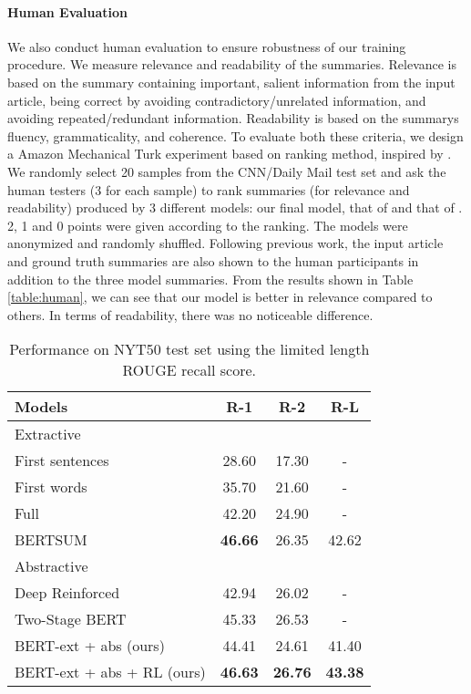 \documentclass[11pt,a4paper]{article}
\begin{document}
\paragraph{Human Evaluation}
We also conduct human evaluation to ensure robustness of our training procedure. We measure
relevance and readability of the summaries. Relevance is based on the summary containing important, salient information from the input article,
being correct by avoiding contradictory/unrelated
information, and avoiding repeated/redundant information. Readability is based on the summarys fluency, grammaticality, and coherence. To
evaluate both these criteria, we design a Amazon Mechanical Turk experiment based on ranking method, inspired by \citet{kiritchenko-mohammad-2017-best}.
We randomly select 20 samples from the CNN/Daily Mail test set and
ask the human testers (3 for each sample) to rank summaries (for relevance and readability) produced by 3 different models:
our final model, that of \citet{chen-bansal-2018-fast} and  that of \citet{liu2019fine}.
2, 1 and 0 points were given according to the ranking.
The models were anonymized and randomly shuffled.
Following previous work,
the input article and ground truth summaries are
also shown to the human participants in addition
to the three model summaries.
From the results shown in Table \ref{table:human}, we can see that our model is
better in relevance compared to others. In terms of readability, there was no
noticeable difference.



\begin{table}
\begin{center}
\begin{adjustbox}{max width=\columnwidth}
\begin{tabular}{l|ccc}
    \hline 
    \bf Models & \bf R-1 & \bf R-2 & \bf R-L \\ 
    \hline
    \multicolumn{4}{l}{Extractive} \\
    \hline
    First sentences \cite{durrett-etal-2016-learning} & 28.60 & 17.30 & - \\
    First  words \cite{durrett-etal-2016-learning} & 35.70 & 21.60 & - \\
    Full \cite{durrett-etal-2016-learning} & 42.20 & 24.90 & - \\
    BERTSUM \cite{liu2019fine} & \bf 46.66 & 26.35 & 42.62 \\
    \hline
    \multicolumn{4}{l}{Abstractive} \\
    \hline
    Deep Reinforced \cite{paulus2018a} & 42.94 & 26.02 & - \\
    Two-Stage BERT \cite{zhang2019pretraining} & 45.33 & 26.53 & - \\
    BERT-ext + abs (ours) & 44.41 & 24.61 & 41.40 \\
    BERT-ext + abs + RL (ours) & \bf 46.63 & \bf 26.76 & \bf 43.38 \\
    \hline
\end{tabular}
\end{adjustbox}
\end{center}
\caption{\label{table:nyt50} Performance on NYT50 test set using the
limited length ROUGE recall score.}
\end{table}
\end{document}
